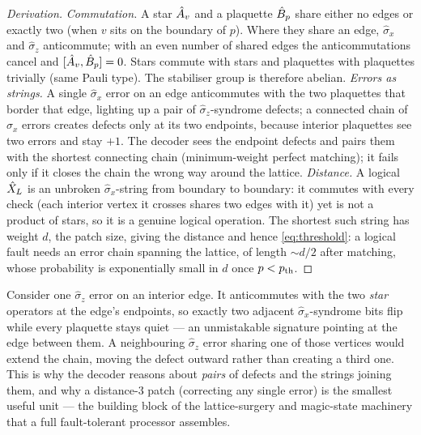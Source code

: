 \begin{proof}[Derivation]
\emph{Commutation.} A star $\hat{A}_v$ and a plaquette $\hat{B}_p$ share
either no edges or exactly two (when $v$ sits on the boundary of $p$).
Where they share an edge, $\hat\sigma_x$ and $\hat\sigma_z$ anticommute;
with an even number of shared edges the anticommutations cancel and
$[\hat{A}_v,\hat{B}_p]=0$. Stars commute with stars and plaquettes with
plaquettes trivially (same Pauli type). The stabiliser group is
therefore abelian. \emph{Errors as strings.} A single $\hat\sigma_x$
error on an edge anticommutes with the two plaquettes that border that
edge, lighting up a pair of $\hat\sigma_z$-syndrome defects; a connected
chain of $\hat\sigma_x$ errors creates defects only at its two endpoints,
because interior plaquettes see two errors and stay $+1$. The decoder
sees the endpoint defects and pairs them with the shortest connecting
chain (minimum-weight perfect matching); it fails only if it closes the
chain the wrong way around the lattice. \emph{Distance.} A logical
$\hat{X}_L$ is an unbroken $\hat\sigma_x$-string from boundary to
boundary: it commutes with every check (each interior vertex it crosses
shares two edges with it) yet is not a product of stars, so it is a
genuine logical operation. The shortest such string has weight $d$, the
patch size, giving the distance and hence \cref{eq:threshold}: a logical
fault needs an error chain spanning the lattice, of length $\sim d/2$
after matching, whose probability is exponentially small in $d$ once
$p<p_{\rm th}$.
\end{proof}

\begin{example}
\label{ex:surface-syndrome}
Consider one $\hat\sigma_z$ error on an interior edge. It anticommutes
with the two \emph{star} operators at the edge's endpoints, so exactly
two adjacent $\hat\sigma_x$-syndrome bits flip while every plaquette
stays quiet --- an unmistakable signature pointing at the edge between
them. A neighbouring $\hat\sigma_z$ error sharing one of those vertices
would extend the chain, moving the defect outward rather than creating a
third one. This is why the decoder reasons about \emph{pairs} of defects
and the strings joining them, and why a distance-$3$ patch (correcting
any single error) is the smallest useful unit --- the building block of
the lattice-surgery and magic-state machinery that a full
fault-tolerant processor assembles.
\end{example}

